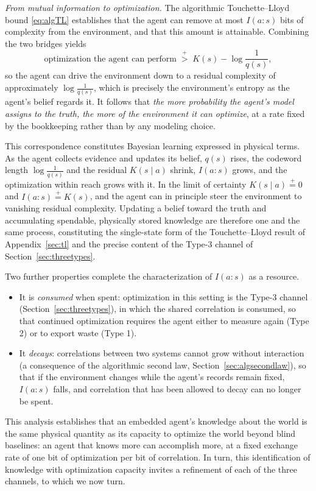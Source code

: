 \documentclass[11pt]{article}
\newcommand{\pgt}{\mathrel{\stackrel{+}{>}}}
\newcommand{\peq}{\mathrel{\stackrel{+}{=}}}
\begin{document}
\emph{From mutual information to optimization.} The algorithmic Touchette--Lloyd bound \eqref{eq:algTL} establishes that the agent can remove at most $I(a:s)$ bits of complexity from the environment, and that this amount is attainable. Combining the two bridges yields
\[
\text{optimization the agent can perform} \;\pgt\; K(s) - \log \frac{1}{q(s)},
\]
so the agent can drive the environment down to a residual complexity of approximately $\log\tfrac{1}{q(s)}$, which is precisely the environment's entropy as the agent's belief regards it. It follows that \emph{the more probability the agent's model assigns to the truth, the more of the environment it can optimize}, at a rate fixed by the bookkeeping rather than by any modeling choice.

This correspondence constitutes Bayesian learning expressed in physical terms. As the agent collects evidence and updates its belief, $q(s)$ rises, the codeword length $\log\tfrac{1}{q(s)}$ and the residual $K(s\mid a)$ shrink, $I(a:s)$ grows, and the optimization within reach grows with it. In the limit of certainty $K(s\mid a) \peq 0$ and $I(a:s) \peq K(s)$, and the agent can in principle steer the environment to vanishing residual complexity. Updating a belief toward the truth and accumulating spendable, physically stored knowledge are therefore one and the same process, constituting the single-state form of the Touchette--Lloyd result of Appendix~\ref{sec:tl} and the precise content of the Type-3 channel of Section~\ref{sec:threetypes}.

Two further properties complete the characterization of $I(a:s)$ as a resource.
\begin{itemize}[leftmargin=2em]
  \item It is \emph{consumed} when spent: optimization in this setting is the Type-3 channel (Section~\ref{sec:threetypes}), in which the shared correlation is consumed, so that continued optimization requires the agent either to measure again (Type 2) or to export waste (Type 1).
  \item It \emph{decays}: correlations between two systems cannot grow without interaction (a consequence of the algorithmic second law, Section~\ref{sec:algsecondlaw}), so that if the environment changes while the agent's records remain fixed, $I(a:s)$ falls, and correlation that has been allowed to decay can no longer be spent.
\end{itemize}

This analysis establishes that an embedded agent's knowledge about the world is the same physical quantity as its capacity to optimize the world beyond blind baselines: an agent that knows more can accomplish more, at a fixed exchange rate of one bit of optimization per bit of correlation. In turn, this identification of knowledge with optimization capacity invites a refinement of each of the three channels, to which we now turn.
\end{document}
